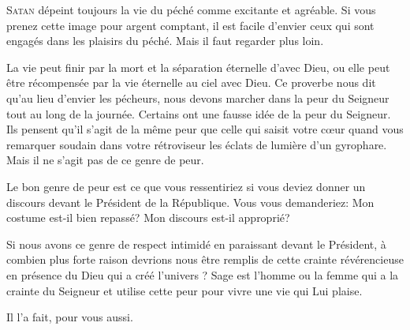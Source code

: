 



\lettrine{S}{atan} dépeint toujours la vie du péché
 comme excitante et agréable.
 Si vous prenez cette image pour argent comptant,
 il est facile d'envier ceux qui sont engagés
 dans les plaisirs du péché. Mais il faut regarder plus loin. 


La vie peut finir par la mort et la séparation éternelle d'avec Dieu,
 ou elle peut être récompensée par la vie éternelle au ciel avec Dieu.
 Ce proverbe nous dit qu'au lieu d'envier les pécheurs,
 nous devons marcher dans la peur 
 du Seigneur tout au long de la journée.
 Certains ont une fausse idée de la peur du Seigneur.
 Ils pensent qu'il s'agit de la même peur que celle qui saisit votre c\oe{}ur
 quand vous remarquer soudain dans votre rétroviseur les éclats de lumière
 d'un gyrophare. Mais il ne s'agit pas de ce genre de peur. 

Le bon genre de peur est ce que vous ressentiriez si vous deviez donner
 un discours devant le Président de la République.
 Vous vous demanderiez: 
 \Og Mon costume est-il bien repassé? 
 Mon discours est-il approprié? \Fg{}

Si nous avons ce genre de respect intimidé en paraissant devant le Président,
 à combien plus forte raison devrions nous être remplis de cette crainte
 révérencieuse en présence du Dieu qui a créé l'univers ?
 Sage est l'homme ou la femme qui a la crainte du Seigneur
 \ocadr et utilise cette peur pour vivre une vie qui Lui plaise. 

Il l'a fait, pour vous aussi.

\dvrule




